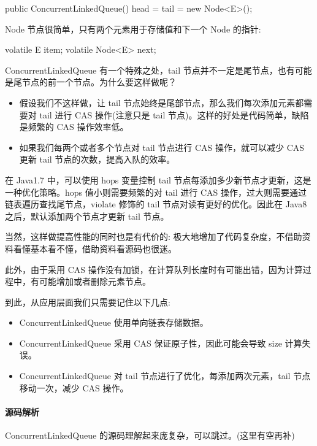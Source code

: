 \begin{Java}
public ConcurrentLinkedQueue() {
    head = tail = new Node<E>();
}
\end{Java}

Node 节点很简单，只有两个元素用于存储值和下一个 Node 的指针:

\begin{Java}
volatile E item;
volatile Node<E> next;
\end{Java}

ConcurrentLinkedQueue 有一个特殊之处，tail 节点并不一定是尾节点，也有可能是尾节点的前一个节点。为什么要这样做呢？

\begin{itemize}
    \item 假设我们不这样做，让 tail 节点始终是尾部节点，那么我们每次添加元素都需要对 tail 进行 CAS 操作(注意只是 tail 节点)。这样的好处是代码简单，缺陷是频繁的 CAS 操作效率低。
    \item 如果我们每两个或者多个节点对 tail 节点进行 CAS 操作，就可以减少 CAS 更新 tail 节点的次数，提高入队的效率。
\end{itemize}

在 Java1.7 中，可以使用 hops 变量控制 tail 节点每添加多少新节点才更新，这是一种优化策略。hops 值小则需要频繁的对 tail 进行 CAS 操作，过大则需要通过链表遍历查找尾节点，violate 修饰的 tail 节点对读有更好的优化。因此在 Java8 之后，默认添加两个节点才更新 tail 节点。

当然，这样做提高性能的同时也是有代价的: 极大地增加了代码复杂度，不借助资料看懂基本看不懂，借助资料看源码也很迷。

此外，由于采用 CAS 操作没有加锁，在计算队列长度时有可能出错，因为计算过程中，有可能增加或者删除元素节点。

到此，从应用层面我们只需要记住以下几点:
\begin{itemize}
    \item ConcurrentLinkedQueue 使用单向链表存储数据。
    \item ConcurrentLinkedQueue 采用 CAS 保证原子性，因此可能会导致 size 计算失误。
    \item ConcurrentLinkedQueue 对 tail 节点进行了优化，每添加两次元素，tail 节点移动一次，减少 CAS 操作。
\end{itemize}

\paragraph*{源码解析}

ConcurrentLinkedQueue 的源码理解起来庞复杂，可以跳过。(这里有空再补)

